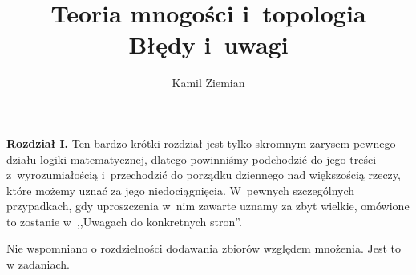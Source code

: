 \documentclass[a4paper,11pt]{article}
\title{Teoria mnogości i~topologia \\
  {\Large Błędy i~uwagi}}
\author{Kamil Ziemian}
\begin{document}





\maketitle  %












\vspace{0em}



\vspace{0em}


\noindent
\textbf{Rozdział I.} Ten bardzo krótki rozdział jest tylko skromnym zarysem pewnego działu logiki matematycznej, dlatego powinniśmy podchodzić do jego treści
z~wyrozumiałością i~przechodzić do porządku dziennego nad większością rzeczy, które możemy uznać za jego niedociągnięcia. W~pewnych szczególnych przypadkach,
gdy uproszczenia w~nim zawarte uznamy za zbyt wielkie, omówione to zostanie w~,,Uwagach do konkretnych stron''.

\vspace{\spaceFour}













Nie wspomniano o rozdzielności dodawania zbiorów względem mnożenia. Jest to w zadaniach.
\end{document}

